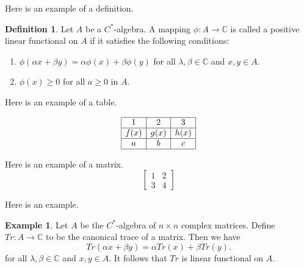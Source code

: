 \documentclass[12pt, reqno]{amsart}
\theoremstyle{definition}
\newtheorem{definition}[theorem]{Definition}
\newtheorem{example}[theorem]{Example}
\theoremstyle{remark}
\numberwithin{equation}{section}
\begin{document}
Here is an example of a definition. 

\begin{definition} Let $A$ be a $C^*$-algebra. A mapping
$\phi :A\rightarrow \mathbb{C} $ is
called a positive linear functional on $A$ if it satisfies the following conditions:

\begin{enumerate}

\item $\phi(\alpha x+\beta y)=\alpha \phi(x)+\beta\phi(y)$ for all $\lambda ,\beta \in  \mathbb{C}$ and $x,y\in A$.

\item $\phi(x)\geq 0$ for all $a\geq 0$ in $A$.
\end{enumerate}
\end{definition}


Here is an example of a table.

\begin{table}[ht]
\caption{}\label{eqtable}
\renewcommand\arraystretch{1.5}
\noindent\[
\begin{array}{|c|c|c|}
\hline
1&2&3\\
\hline f(x)&g(x)&h(x)\\
\hline a&b&c\\
\hline
\end{array}
\]
\end{table}

Here is an example of a matrix.
\begin{equation*}
\begin{bmatrix}
1 & 2 \\
3 &  4
\end{bmatrix}
\end{equation*}


Here is an example.


\begin{example} Let $A$ be the $C^*$-algebra of $n\times n$ complex matrices. Define $Tr: A\rightarrow \mathbb{C}$ to be the canonical trace of a matrix. Then we have
\begin{equation}\label{2.1}
Tr(\alpha x+\beta y)=\alpha Tr(x)+\beta Tr(y).
\end{equation}
for all $\lambda ,\beta \in  \mathbb{C}$ and $x,y\in A$. It follows that $Tr$ is linear functional on $A$.
\end{example}
\end{document}
